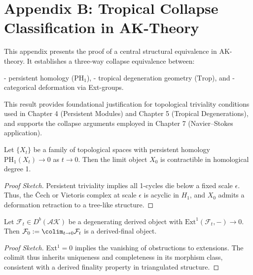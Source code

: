 \documentclass[11pt]{article}
\begin{document}

\section*{Appendix B: Tropical Collapse Classification in AK-Theory}

This appendix presents the proof of a central structural equivalence in AK-theory.  
It establishes a three-way collapse equivalence between:

- persistent homology ($\mathrm{PH}_1$),
- tropical degeneration geometry ($\mathrm{Trop}$), and
- categorical deformation via Ext-groups.

This result provides foundational justification for topological triviality conditions  
used in Chapter 4 (Persistent Modules) and Chapter 5 (Tropical Degenerations),  
and supports the collapse arguments employed in Chapter 7 (Navier–Stokes application).

\begin{lemma}
Let $\{X_t\}$ be a family of topological spaces with persistent homology $\mathrm{PH}_1(X_t) \to 0$ as $t \to 0$.  
Then the limit object $X_0$ is contractible in homological degree 1.
\end{lemma}

\begin{proof}[Proof Sketch]
Persistent triviality implies all 1-cycles die below a fixed scale $\epsilon$.  
Thus, the \v{C}ech or Vietoris complex at scale $\epsilon$ is acyclic in $H_1$, and $X_0$ admits a deformation retraction to a tree-like structure.
\end{proof}

\begin{lemma}
Let $\mathcal{F}_t \in D^b(\mathcal{AK})$ be a degenerating derived object with $\mathrm{Ext}^1(\mathcal{F}_t, -) \to 0$.  
Then $\mathcal{F}_0 := \colim_{t \to 0} \mathcal{F}_t$ is a derived-final object.
\end{lemma}

\begin{proof}[Proof Sketch]
Ext$^1 = 0$ implies the vanishing of obstructions to extensions.  
The colimit thus inherits uniqueness and completeness in its morphism class, consistent with a derived finality property in triangulated structure.
\end{proof}
\end{document}
